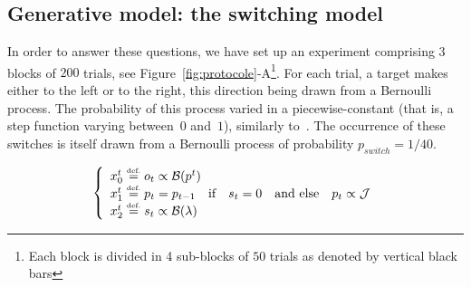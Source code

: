\documentclass[profile,final,english, draft]{article}%
\newcommand{\choice}[1]{ %
	\left\{ %
		\begin{array}{l} #1 \end{array} %
	\right. }
\newcommand{\eqdef}{\ensuremath{\stackrel{\mbox{\upshape\tiny def.}}{=}}}
\newcommand{\eql}[1]{\begin{equation}#1\end{equation}}
\newcommand{\Bb}{\mathcal{B}}
\newcommand{\Jj}{\mathcal{J}}
\begin{document}
\subsection{Generative model: the switching model}

In order to answer these questions, we have set up an experiment comprising $3$ blocks of $200$ trials, see Figure~\ref{fig:protocole}-A\footnote{Each block is divided in 4 sub-blocks of $50$ trials as denoted by vertical black bars}. For each trial, a target makes either to the left or to the right, this direction being drawn from a Bernoulli process. The probability of this process varied in a piecewise-constant (that is, a step function varying between~$0$ and~$1$), similarly to~\textcite{Meyniel13}. The occurrence of these switches is itself drawn from a Bernoulli process of probability $p_{switch}=1/40$.

\eql{\choice{
x_0^t \eqdef o_t \propto \Bb(p^t) \\
x_1^t \eqdef p_t = p_{t-1} \quad \text{if} \quad s_t=0 \quad \text{and else} \quad p_t \propto \Jj \\
x_2^t \eqdef s_t \propto \Bb(\lambda) 
}}
\end{document}
